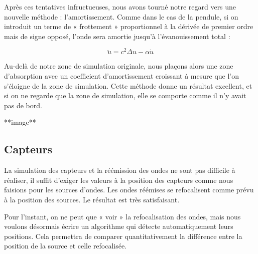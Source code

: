 \documentclass[11pt, a4paper]{article}
\begin{document}
Après ces tentatives infructueuses, nous avons tourné notre regard vers une nouvelle méthode : l'amortissement. Comme dans le cas de la pendule, si on introduit un terme de « frottement » proportionnel à la dérivée de premier ordre mais de signe opposé, l'onde sera amortie jusqu'à l'évanouissement total :

$$
    \ddot{u}=c^2\Delta u - \alpha\dot{u}
$$

Au-delà de notre zone de simulation originale, nous plaçons alors une zone d'absorption avec un coefficient d'amortissement croissant à mesure que l'on s'éloigne de la zone de simulation. Cette méthode donne un résultat excellent, et si on ne regarde que la zone de simulation, elle se comporte comme il n'y avait pas de bord.

**image**

\subsection{Capteurs}
La simulation des capteurs et la réémission des ondes ne sont pas difficile à réaliser, il suffit d'exiger les valeurs à la position des capteurs comme nous faisions pour les sources d'ondes. Les ondes réémises se refocalisent comme prévu à la position des sources. Le résultat est très satisfaisant.

Pour l'instant, on ne peut que « voir » la refocalisation des ondes, mais nous voulons désormais écrire un algorithme qui détecte automatiquement leurs positions. Cela permettra de comparer quantitativement la différence entre la position de la source et celle refocalisée.
\end{document}
